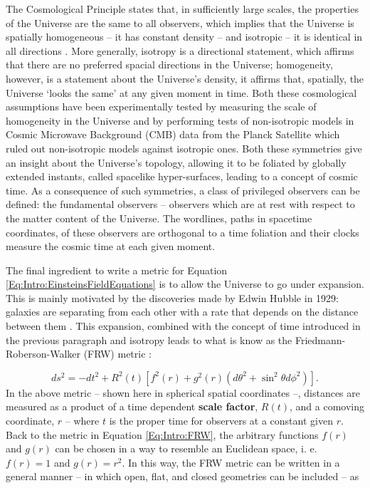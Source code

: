 \qquad The Cosmological Principle states that, in sufficiently large scales, the properties of the Universe are the same to all observers, which implies that the Universe is spatially homogeneous -- it has constant density  -- and isotropic -- it is identical in all directions \citep{keel2002road}.  More generally, isotropy is a directional statement, which affirms that there are no preferred spacial directions in the Universe; homogeneity, however, is a statement about the Universe's density, it affirms that, spatially, the Universe `looks the same' at any given moment in time. Both these cosmological assumptions have been experimentally tested by measuring the scale of homogeneity in the Universe \citep{1999NaturWu} and by performing tests of non-isotropic models in Cosmic Microwave Background (CMB) data from the Planck Satellite \citep{2016PhRvLSaadeh} which ruled out non-isotropic models against isotropic ones. Both these symmetries give an insight about the Universe's topology, allowing it to be foliated by globally extended instants, called spacelike hyper-surfaces, leading to a concept of cosmic time. As a consequence of such symmetries, a class of privileged observers can be defined: the fundamental observers -- observers which are at rest with respect to the matter content of the Universe. The wordlines, paths in spacetime coordinates, of these observers are orthogonal to a time foliation and their clocks measure the cosmic time at each given moment. 

\qquad The final ingredient to write a metric for Equation \eqref{Eq:Intro:EinsteinsFieldEquations} is to allow the Universe to go under expansion. This is mainly motivated by the discoveries made by Edwin Hubble in 1929: galaxies are separating from each other with a rate that depends on the distance between them \citep{1929Hubble}. This expansion, combined with the concept of time introduced in the previous paragraph and isotropy leads to what is know as the Friedmann-Roberson-Walker (FRW) metric \citep{1922Friedmann,Peacock,dods}:


\begin{equation}
ds^2 = -dt^2 + R^2(t)\left[f^2(r) + g^2(r)\left(d\theta^2 + \sin^2\theta d\phi^2\right)\right].
\label{Eq:Intro:FRW}
\end{equation}
In the above metric -- shown here in spherical spatial coordinates --, distances are measured as a product of a time dependent \textbf{scale factor}, $R(t)$, and a comoving coordinate, $r$ -- where $t$ is the proper time for observers at a constant given $r$. Back to the metric in Equation \eqref{Eq:Intro:FRW}, the arbitrary functions $f(r)$ and $g(r)$ can be chosen in a way to resemble an Euclidean space, i. e. $f(r) = 1$ and $g(r) = r^2$. In this way, the FRW metric can be written in a general manner -- in which open, flat, and closed geometries can be included -- as 

